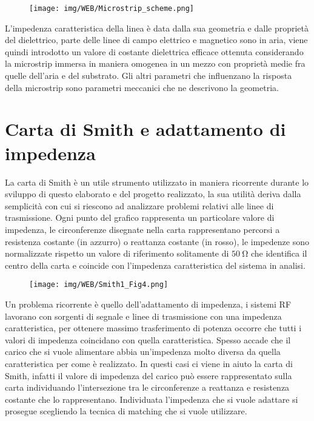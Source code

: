 \documentclass[12pt,oneside]{book}
\begin{document}
\begin{figure}[!htbp]
    \centering
        \texttt{[image: img/WEB/Microstrip\_scheme.png]}
    \caption{}
    \label{microstrip}
\end{figure}

L'impedenza caratteristica della linea è data dalla sua geometria e dalle proprietà del dielettrico, parte delle linee di campo elettrico e magnetico sono in aria, viene quindi introdotto un valore di costante dielettrica efficace ottenuta considerando la microstrip immersa in maniera omogenea in un mezzo con proprietà medie fra quelle dell'aria e del substrato. Gli altri parametri che influenzano la risposta della microstrip sono parametri meccanici che ne descrivono la geometria.


\section{Carta di Smith e adattamento di impedenza}

La carta di Smith è un utile strumento utilizzato in maniera ricorrente durante lo sviluppo di questo elaborato e del progetto realizzato, la sua utilità deriva dalla semplicità con cui si riescono ad analizzare problemi relativi alle linee di trasmissione.
Ogni punto del grafico rappresenta un particolare valore di impedenza, le circonferenze disegnate nella carta rappresentano percorsi a resistenza costante (in azzurro) o reattanza costante (in rosso), le impedenze sono normalizzate rispetto un valore di riferimento solitamente di $\SI{50}{\ohm}$ che identifica il centro della carta e coincide con l'impedenza caratteristica del sistema in analisi.

\begin{figure}[!htbp]
    \centering
        \texttt{[image: img/WEB/Smith1\_Fig4.png]}
        \caption{}
\end{figure}

Un problema ricorrente è quello dell'adattamento di impedenza, i sistemi RF lavorano con sorgenti di segnale e linee di trasmissione con una impedenza caratteristica, per ottenere massimo trasferimento di potenza occorre che tutti i valori di impedenza coincidano con quella caratteristica. Spesso accade che il carico che si vuole alimentare abbia un'impedenza molto diversa da quella caratteristica per come è realizzato. In questi casi ci viene in aiuto la carta di Smith, infatti il valore di impedenza del carico può essere rappresentato sulla carta individuando l'intersezione tra le circonferenze a reattanza e resistenza costante che lo rappresentano. Individuata l'impedenza che si vuole adattare si prosegue scegliendo la tecnica di matching che si vuole utilizzare.
\end{document}
